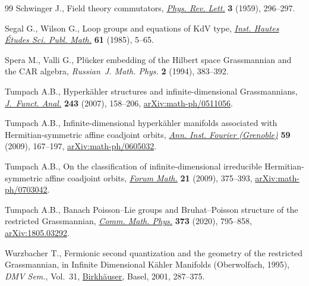 \begin{thebibliography}{99}
Schwinger J., Field theory commutators, \href{https://doi.org/10.1103/PhysRevLett.3.296}{\textit{Phys. Rev. Lett.}} \textbf{3}
 (1959), 296--297.

Segal G., Wilson G., Loop groups and equations of {K}d{V} type, \href{https://doi.org/10.1007/BF02698802}{\textit{Inst.
 Hautes \'Etudes Sci. Publ. Math.}} \textbf{61} (1985), 5--65.

Spera M., Valli G., Pl\"ucker embedding of the {H}ilbert space {G}rassmannian
 and the {CAR} algebra, \textit{Russian~J. Math. Phys.} \textbf{2} (1994),
 383--392.

Tumpach A.B., Hyperk\"ahler structures and infinite-dimensional
 {G}rassmannians, \href{https://doi.org/10.1016/j.jfa.2006.05.019}{\textit{J.~Funct. Anal.}} \textbf{243} (2007), 158--206,
 \href{https://arxiv.org/abs/math-ph/0511056}{arXiv:math-ph/0511056}.

Tumpach A.B., Infinite-dimensional hyperk\"ahler manifolds associated with
 {H}ermitian-symmetric affine coadjoint orbits, \href{https://doi.org/10.5802/aif.2428}{\textit{Ann. Inst. Fourier
 (Grenoble)}} \textbf{59} (2009), 167--197, \href{https://arxiv.org/abs/math-ph/0605032}{arXiv:math-ph/0605032}.

Tumpach A.B., On the classification of infinite-dimensional irreducible
 {H}ermitian-symmetric affine coadjoint orbits, \href{https://doi.org/10.1515/FORUM.2009.018}{\textit{Forum Math.}}
 \textbf{21} (2009), 375--393, \href{https://arxiv.org/abs/math-ph/0703042}{arXiv:math-ph/0703042}.

Tumpach A.B., Banach {P}oisson--{L}ie groups and {B}ruhat--{P}oisson structure
 of the restricted {G}rassmannian, \href{https://doi.org/10.1007/s00220-019-03674-3}{\textit{Comm. Math. Phys.}} \textbf{373}
 (2020), 795--858, \href{https://arxiv.org/abs/1805.03292}{arXiv:1805.03292}.

Wurzbacher T., Fermionic second quantization and the geometry of the restricted
 {G}rassmannian, in Infinite {D}imensional {K}\"ahler {M}anifolds
 ({O}berwolfach, 1995), \textit{DMV Sem.}, Vol.~31, \href{https://doi.org/10.1007/978-3-0348-8227-9_6}{Birkh\"auser}, Basel, 2001,
 287--375.

\end{thebibliography}
